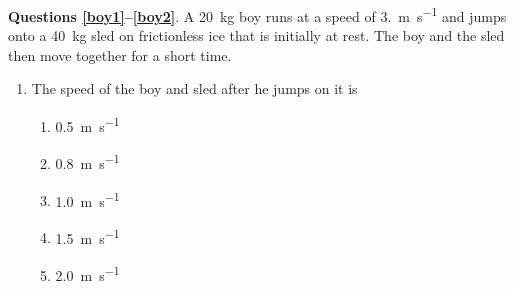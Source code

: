 \documentclass{../../oss-apphys}
\begin{document}
\begin{multicols}{2}

    
  \textbf{Questions \ref{boy1}--\ref{boy2}}. A \SI{20}{\kilo\gram} boy runs at
  a speed of \SI{3.}{\metre\per\second} and jumps onto a \SI{40}{\kilo\gram}
  sled on frictionless ice that is initially at rest. The boy and the sled then
  move together for a short time.
  \begin{enumerate}[resume,leftmargin=18pt]
  \item The speed of the boy and sled after he jumps on it is
    \label{boy1}
    \begin{enumerate}[noitemsep,topsep=0pt,leftmargin=18pt,label=(\Alph*)]
    \item\SI{0.5}{\metre\per\second}
    \item\SI{0.8}{\metre\per\second}
    \item\SI{1.0}{\metre\per\second}
    \item\SI{1.5}{\metre\per\second}
    \item\SI{2.0}{\metre\per\second}
    \end{enumerate}
    

\end{enumerate}
\end{multicols}
\end{document}
